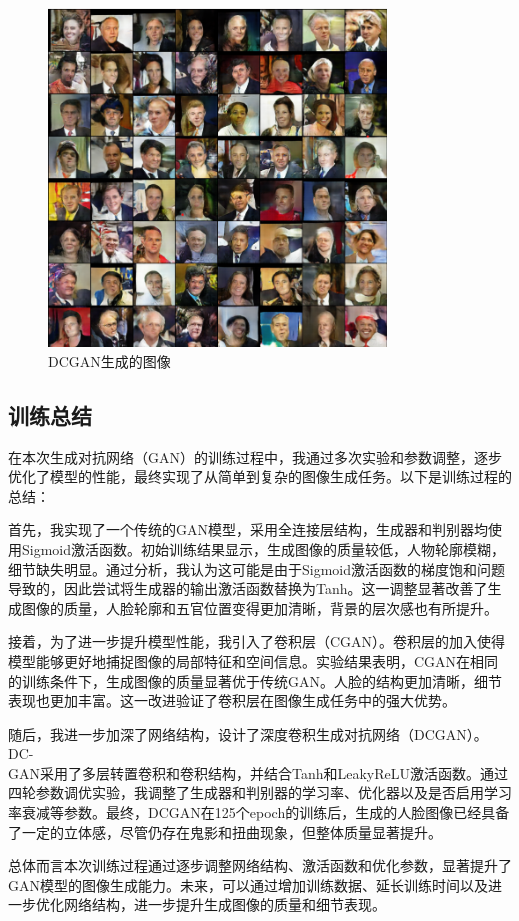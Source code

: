 \documentclass[UTF8]{ctexart}
\begin{document}
\begin{figure}[H]
\centering
\includegraphics[width=0.8\textwidth]{./images/DCGAN.png}
\caption{DCGAN生成的图像}
\label{fig:DCGAN}
\end{figure}
\subsection{训练总结}
在本次生成对抗网络（GAN）的训练过程中，我通过多次实验和参数调整，逐步优化了模型的性能，最终实现了从简单到复杂的图像生成任务。以下是训练过程的总结：\par
首先，我实现了一个传统的GAN模型，采用全连接层结构，生成器和判别器均使用Sigmoid激活函数。初始训练结果显示，生成图像的质量较低，人物轮廓模糊，细节缺失明显。通过分析，我认为这可能是由于Sigmoid激活函数的梯度饱和问题导致的，因此尝试将生成器的输出激活函数替换为Tanh。这一调整显著改善了生成图像的质量，人脸轮廓和五官位置变得更加清晰，背景的层次感也有所提升。\par
接着，为了进一步提升模型性能，我引入了卷积层（CGAN）。卷积层的加入使得模型能够更好地捕捉图像的局部特征和空间信息。实验结果表明，CGAN在相同的训练条件下，生成图像的质量显著优于传统GAN。人脸的结构更加清晰，细节表现也更加丰富。这一改进验证了卷积层在图像生成任务中的强大优势。\par
随后，我进一步加深了网络结构，设计了深度卷积生成对抗网络（DCGAN）。DC-\\GAN采用了多层转置卷积和卷积结构，并结合Tanh和LeakyReLU激活函数。通过四轮参数调优实验，我调整了生成器和判别器的学习率、优化器以及是否启用学习率衰减等参数。最终，DCGAN在125个epoch的训练后，生成的人脸图像已经具备了一定的立体感，尽管仍存在鬼影和扭曲现象，但整体质量显著提升。\par
总体而言本次训练过程通过逐步调整网络结构、激活函数和优化参数，显著提升了GAN模型的图像生成能力。未来，可以通过增加训练数据、延长训练时间以及进一步优化网络结构，进一步提升生成图像的质量和细节表现。
\end{document}
